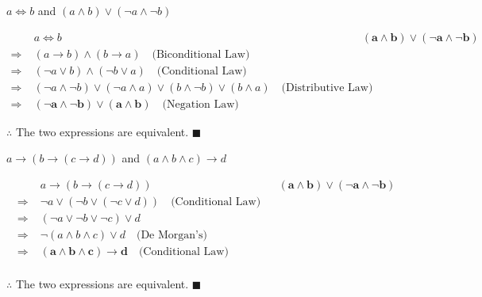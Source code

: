 \documentclass[]{article}
\begin{document}
\begin{question}
    $a \iff b$ and $(a \land b) \lor (\neg a \land \neg b)$
\end{question}
\begin{align*}
    & a \iff b & & \mathbf{(a \land b) \lor (\neg a \land \neg b)} \\
    \Rightarrow\; & (a \rightarrow b) \land (b \rightarrow a) \quad \text{(Biconditional Law)} \\
    \Rightarrow\; & (\neg a \lor b ) \land (\neg b \lor a) \quad \text{(Conditional Law)} \\
    \Rightarrow\; & (\neg a \land \neg b) \lor (\neg a \land a) \lor (b \land \neg b) \lor (b \land a) \quad \text{(Distributive Law)} \\ 
    \Rightarrow\; & \mathbf{(\neg a \land \neg b) \lor (a \land b)} \quad \text{(Negation Law)}
\end{align*}
\begin{center}
    $\therefore$ The two expressions are equivalent. $\blacksquare$
\end{center}

\begin{question}
    $a \rightarrow (b \rightarrow (c \rightarrow d))$ and $(a \land b \land c) \rightarrow d$
\end{question}
\begin{align*}
    & a \rightarrow (b \rightarrow (c \rightarrow d)) & & \mathbf{(a \land b) \lor (\neg a \land \neg b)} \\
    \Rightarrow\; & \neg a \lor (\neg b \lor (\neg c \lor d)) \quad \text{(Conditional Law)} \\
    \Rightarrow\; & (\neg a \lor \neg b \lor \neg c) \lor d \\
    \Rightarrow\; & \neg(a \land b \land c) \lor d \quad \text{(De Morgan's)} \\
    \Rightarrow\; & \mathbf{(a \land b \land c) \rightarrow d} \quad \text{(Conditional Law)} \\
\end{align*}
\begin{center}
    $\therefore$ The two expressions are equivalent. $\blacksquare$
\end{center}
\end{document}
